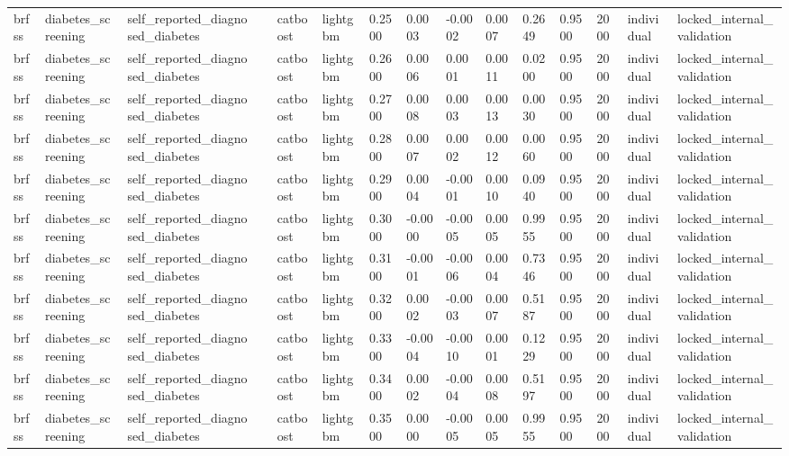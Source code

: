\begin{tabular}{lllllllllllllll}
brfss & diabetes\_screening & self\_reported\_diagnosed\_diabetes &  & catboost & lightgbm & 0.2500 & 0.0003 & -0.0002 & 0.0007 & 0.2649 & 0.9500 & 2000 & individual & locked\_internal\_validation \\
brfss & diabetes\_screening & self\_reported\_diagnosed\_diabetes &  & catboost & lightgbm & 0.2600 & 0.0006 & 0.0001 & 0.0011 & 0.0200 & 0.9500 & 2000 & individual & locked\_internal\_validation \\
brfss & diabetes\_screening & self\_reported\_diagnosed\_diabetes &  & catboost & lightgbm & 0.2700 & 0.0008 & 0.0003 & 0.0013 & 0.0030 & 0.9500 & 2000 & individual & locked\_internal\_validation \\
brfss & diabetes\_screening & self\_reported\_diagnosed\_diabetes &  & catboost & lightgbm & 0.2800 & 0.0007 & 0.0002 & 0.0012 & 0.0060 & 0.9500 & 2000 & individual & locked\_internal\_validation \\
brfss & diabetes\_screening & self\_reported\_diagnosed\_diabetes &  & catboost & lightgbm & 0.2900 & 0.0004 & -0.0001 & 0.0010 & 0.0940 & 0.9500 & 2000 & individual & locked\_internal\_validation \\
brfss & diabetes\_screening & self\_reported\_diagnosed\_diabetes &  & catboost & lightgbm & 0.3000 & -0.0000 & -0.0005 & 0.0005 & 0.9955 & 0.9500 & 2000 & individual & locked\_internal\_validation \\
brfss & diabetes\_screening & self\_reported\_diagnosed\_diabetes &  & catboost & lightgbm & 0.3100 & -0.0001 & -0.0006 & 0.0004 & 0.7346 & 0.9500 & 2000 & individual & locked\_internal\_validation \\
brfss & diabetes\_screening & self\_reported\_diagnosed\_diabetes &  & catboost & lightgbm & 0.3200 & 0.0002 & -0.0003 & 0.0007 & 0.5187 & 0.9500 & 2000 & individual & locked\_internal\_validation \\
brfss & diabetes\_screening & self\_reported\_diagnosed\_diabetes &  & catboost & lightgbm & 0.3300 & -0.0004 & -0.0010 & 0.0001 & 0.1229 & 0.9500 & 2000 & individual & locked\_internal\_validation \\
brfss & diabetes\_screening & self\_reported\_diagnosed\_diabetes &  & catboost & lightgbm & 0.3400 & 0.0002 & -0.0004 & 0.0008 & 0.5197 & 0.9500 & 2000 & individual & locked\_internal\_validation \\
brfss & diabetes\_screening & self\_reported\_diagnosed\_diabetes &  & catboost & lightgbm & 0.3500 & 0.0000 & -0.0005 & 0.0005 & 0.9955 & 0.9500 & 2000 & individual & locked\_internal\_validation \\

\end{tabular}
